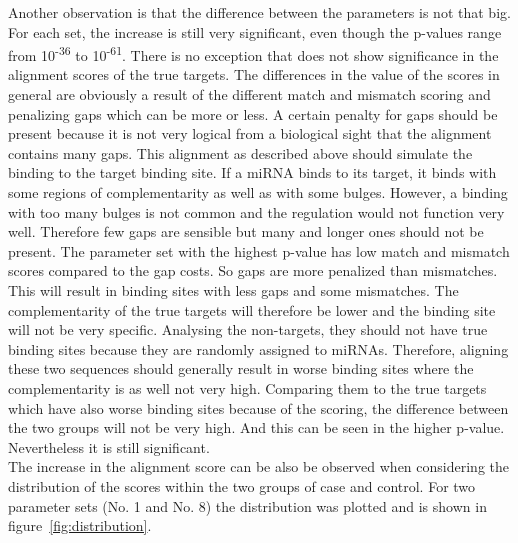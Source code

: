 \documentclass[12pt]{article}
\begin{document}
Another observation is that the difference between the parameters is not that big. For each set, the increase is still very significant, even though the p-values range from 10\textsuperscript{-36} to 10\textsuperscript{-61}. There is no exception that does not show significance in the alignment scores of the true targets. The differences in the value of the scores in general are obviously a result of the different match and mismatch scoring and penalizing gaps which can be more or less. A certain penalty for gaps should be present because it is not very logical from a biological sight that the alignment contains many gaps. This alignment as described above should simulate the binding to the target binding site. If a miRNA binds to its target, it binds with some regions of complementarity as well as with some bulges. However, a binding with too many bulges is not common and the regulation would not function very well. Therefore few gaps are sensible but many and longer ones should not be present.
The parameter set with the highest p-value has low match and mismatch scores compared to the gap costs. So gaps are more penalized than mismatches. This will result in binding sites with less gaps and some mismatches. The complementarity of the true targets will therefore be lower and the binding site will not be very specific. Analysing the non-targets, they should not have true binding sites because they are randomly assigned to miRNAs. Therefore, aligning these two sequences should generally result in worse binding sites where the complementarity is as well not very high. Comparing them to the true targets which have also worse binding sites because of the scoring, the difference between the two groups will not be very high. And this can be seen in the higher p-value. Nevertheless it is still significant. \\

The increase in the alignment score can be also be observed when considering the distribution of the scores within the two groups of case and control. For two parameter sets (No. 1 and No. 8) the distribution was plotted and is shown in figure~\ref{fig:distribution}. 
\end{document}
